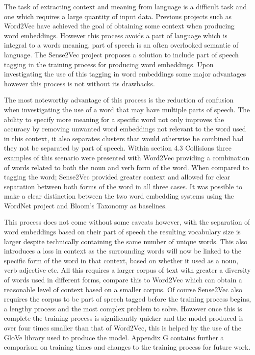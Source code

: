 The task of extracting context and meaning from language is a difficult task and one which requires a large quantity of input data. Previous projects such as Word2Vec have achieved the goal of obtaining some context when producing word embeddings. However this process avoids a part of language which is integral to a words meaning, part of speech is an often overlooked semantic of language. The Sense2Vec project proposes a solution to include part of speech tagging in the training process for producing word embeddings. Upon investigating the use of this tagging in word embeddings some major advantages however this process is not without its drawbacks.

The most noteworthy advantage of this process is the reduction of confusion when investigating the use of a word that may have multiple parts of speech. The ability to specify more meaning for a specific word not only improves the accuracy by removing unwanted word embeddings not relevant to the word used in this context, it also separates clusters that would otherwise be combined had they not be separated by part of speech. Within section 4.3 Collisions three examples of this scenario were presented with Word2Vec providing a combination of words related to both the noun and verb form of the word. When compared to tagging the word; Sense2Vec provided greater context and allowed for clear separation between both forms of the word in all three cases. It was possible to make a clear distinction between the two word embedding systems using the WordNet project and Bloom's Taxonomy as baselines.

This process does not come without some caveats however, with the separation of word embeddings based on their part of speech the resulting vocabulary size is larger despite technically containing the same number of unique words. This also introduces a loss in context as the surrounding words will now be linked to the specific form of the word in that context, based on whether it used as a noun, verb adjective etc. All this requires a larger corpus of text with greater a diversity of words used in different forms, compare this to Word2Vec which can obtain a reasonable level of context based on a smaller corpus. Of course Sense2Vec also requires the corpus to be part of speech tagged before the training process begins, a lengthy process and the most complex problem to solve. However once this is complete the training process is significantly quicker and the model produced is over four times smaller than that of Word2Vec, this is helped by the use of the GloVe library used to produce the model. Appendix G contains further a comparison on training times and changes to the training process for future work.
